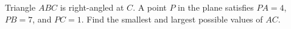 Triangle $ABC$ is right-angled at $C$. A point $P$ in the plane satisfies $PA=4$, $PB=7$, and $PC=1$. Find the smallest and largest possible values of $AC$.
